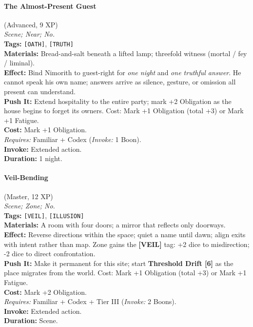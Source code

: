 \paragraph{The Almost-Present Guest} (Advanced, 9 XP) \hfill \\
\emph{Scene; Near; No.} \\
\textbf{Tags:} \texttt{[OATH]}, \texttt{[TRUTH]} \\
\textbf{Materials:} Bread-and-salt beneath a lifted lamp; threefold witness (mortal / fey / liminal). \\
\textbf{Effect:} Bind Nimorith to guest-right for \emph{one night} and \emph{one truthful answer}. He cannot speak his own name; answers arrive as silence, gesture, or omission all present can understand. \\
\textbf{Push It:} Extend hospitality to the entire party; mark +2 Obligation as the house begins to forget its owners. Cost: Mark +1 Obligation (total +3) or Mark +1 Fatigue. \\
\textbf{Cost:} Mark +1 Obligation. \\
\textit{Requires:} Familiar + Codex (\textit{Invoke:} 1 Boon). \\
\textbf{Invoke:} Extended action. \\
\textbf{Duration:} 1 night.

\paragraph{Veil-Bending} (Master, 12 XP) \hfill \\
\emph{Scene; Zone; No.} \\
\textbf{Tags:} \texttt{[VEIL]}, \texttt{[ILLUSION]} \\
\textbf{Materials:} A room with four doors; a mirror that reflects only doorways. \\
\textbf{Effect:} Reverse directions within the space; quiet a name until dawn; align exits with intent rather than map. Zone gains the \textbf{[VEIL]} tag: +2 dice to misdirection; -2 dice to direct confrontation. \\
\textbf{Push It:} Make it permanent for this site; start \textbf{Threshold Drift [6]} as the place migrates from the world. Cost: Mark +1 Obligation (total +3) or Mark +1 Fatigue. \\
\textbf{Cost:} Mark +2 Obligation. \\
\textit{Requires:} Familiar + Codex + Tier III (\textit{Invoke:} 2 Boons). \\
\textbf{Invoke:} Extended action. \\
\textbf{Duration:} Scene.

